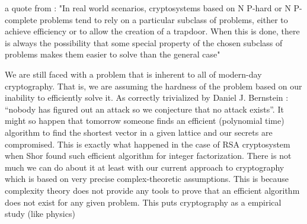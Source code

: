 a quote from \cite{intro_cryp}: "In real world scenarios, cryptosystems based on N P-hard or N P-complete problems tend to rely on a particular subclass of problems, either to achieve efficiency or to allow the creation of a trapdoor. When this is done, there is always the possibility that some special property of the chosen subclass of problems makes them easier to solve than the general case"
\begin{remark}
    We are still faced with a problem that is inherent to all of modern-day cryptography. That is, we are assuming the hardness of the problem based on our inability to efficiently solve it. As correctly trivialized by Daniel J. Bernstein \cite{bernstein}: ``nobody has figured out an attack so we conjecture that no attack exists''. It might so happen that tomorrow someone finds an efficient (polynomial time) algorithm to find the shortest vector in a given lattice and our secrets are compromised. This is exactly what happened in the case of RSA cryptosystem when Shor found such efficient algorithm for integer factorization. There is not much we can do about it at least with our current approach to cryptography which is based on very precise complex-theoretic assumptions. This is because complexity theory does not provide any tools to prove that an efficient algorithm does not exist for any given problem. This puts cryptography as a empirical study (like physics)
\end{remark}